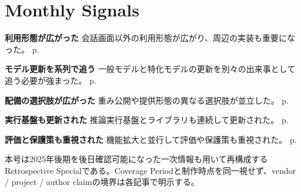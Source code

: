 \section*{Monthly Signals}
\smallskip
\noindent \textbf{利用形態が広がった} 会話画面以外の利用形態が広がり、周辺の実装も重要になった。 \hfill{\footnotesize p.~\pageref{pkg:agent}}
\par
\smallskip
\noindent \textbf{モデル更新を系列で追う} 一般モデルと特化モデルの更新を別々の出来事として追う必要が強まった。 \hfill{\footnotesize p.~\pageref{pkg:model}}
\par
\smallskip
\noindent \textbf{配備の選択肢が広がった} 重み公開や提供形態の異なる選択肢が並立した。 \hfill{\footnotesize p.~\pageref{pkg:open}}
\par
\smallskip
\noindent \textbf{実行基盤も更新された} 推論実行基盤とライブラリも連続して更新された。 \hfill{\footnotesize p.~\pageref{pkg:runtime}}
\par
\smallskip
\noindent \textbf{評価と保護策も重視された} 機能拡大と並行して評価や保護策も重視された。 \hfill{\footnotesize p.~\pageref{pkg:control}}
\par
\medskip
\begin{claimboundary}
本号は2025年後期を後日確認可能になった一次情報も用いて再構成するRetrospective Specialである。Coverage Periodと制作時点を同一視せず、vendor / project / author claimの境界は各記事で明示する。
\end{claimboundary}
\medskip
\tableofcontents
